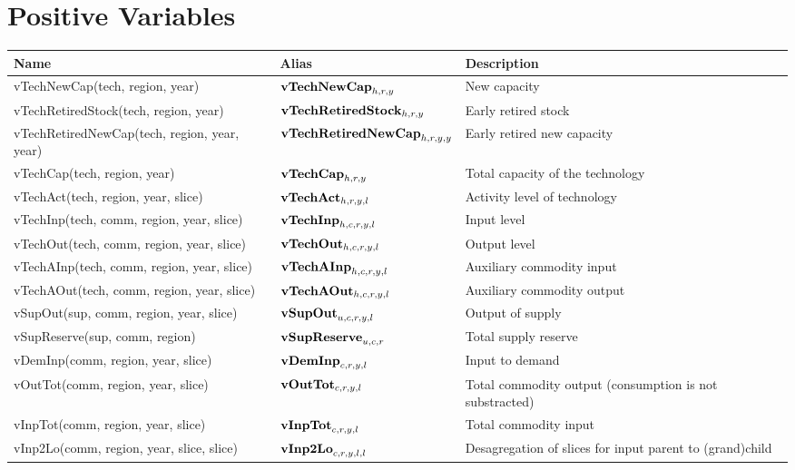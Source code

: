 \documentclass{article}
\begin{document}
\section*{Positive Variables}
\begin{longtable}{|p{10cm}|p{5cm}|p{9cm}|}
\hline
\bf{Name} & \bf{Alias}   & \bf{Description} \\ 
 \hline
vTechNewCap(tech, region, year) & ${\bf vTechNewCap}_{h,r,y}$ & New capacity \\ 
 \hline
vTechRetiredStock(tech, region, year) & ${\bf vTechRetiredStock}_{h,r,y}$ & Early retired stock \\ 
 \hline
vTechRetiredNewCap(tech, region, year, year) & ${\bf vTechRetiredNewCap}_{h,r,y,y}$ & Early retired new capacity \\ 
 \hline
vTechCap(tech, region, year) & ${\bf vTechCap}_{h,r,y}$ & Total capacity of the technology \\ 
 \hline
vTechAct(tech, region, year, slice) & ${\bf vTechAct}_{h,r,y,l}$ & Activity level of technology \\ 
 \hline
vTechInp(tech, comm, region, year, slice) & ${\bf vTechInp}_{h,c,r,y,l}$ & Input level \\ 
 \hline
vTechOut(tech, comm, region, year, slice) & ${\bf vTechOut}_{h,c,r,y,l}$ & Output level \\ 
 \hline
vTechAInp(tech, comm, region, year, slice) & ${\bf vTechAInp}_{h,c,r,y,l}$ & Auxiliary commodity input \\ 
 \hline
vTechAOut(tech, comm, region, year, slice) & ${\bf vTechAOut}_{h,c,r,y,l}$ & Auxiliary commodity output \\ 
 \hline
vSupOut(sup, comm, region, year, slice) & ${\bf vSupOut}_{u,c,r,y,l}$ & Output of supply \\ 
 \hline
vSupReserve(sup, comm, region) & ${\bf vSupReserve}_{u,c,r}$ & Total supply reserve \\ 
 \hline
vDemInp(comm, region, year, slice) & ${\bf vDemInp}_{c,r,y,l}$ & Input to demand \\ 
 \hline
vOutTot(comm, region, year, slice) & ${\bf vOutTot}_{c,r,y,l}$ & Total commodity output (consumption is not substracted) \\ 
 \hline
vInpTot(comm, region, year, slice) & ${\bf vInpTot}_{c,r,y,l}$ & Total commodity input \\ 
 \hline
vInp2Lo(comm, region, year, slice, slice) & ${\bf vInp2Lo}_{c,r,y,l,l}$ & Desagregation of slices for input parent to (grand)child \\ 
 \hline

\end{longtable}
\end{document}

